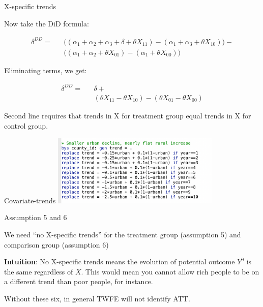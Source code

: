 \documentclass{beamer}
\begin{document}
\begin{frame}{X-specific trends}

Now take the DiD formula:

\begin{eqnarray*}
\delta^{DD} = &&\bigg ( (\alpha_1 + \alpha_2 + \alpha_3 + \delta + \theta X_{11} ) - (\alpha_1 + \alpha_3 + \theta X_{10} ) \bigg )- \\
&& \bigg ( (\alpha_1 + \alpha_2 + \theta X_{01}) - (\alpha_1 + \theta X_{00}) \bigg )
\end{eqnarray*}

\bigskip

Eliminating terms, we get:

\begin{eqnarray*}
\delta^{DD} = &&\delta + \\
&& (\theta X_{11} - \theta X_{10} ) - (\theta X_{01} - \theta X_{00} )
\end{eqnarray*}

\bigskip

Second line requires that trends in X for treatment group equal trends in X for control group.

\end{frame}


\begin{frame}{Covariate-trends}
    \centering
    \includegraphics[width=0.6\textwidth]{./lecture_includes/covariate_trends}
\end{frame}


\begin{frame}{Assumption 5 and 6}

We need ``no X-specific trends'' for the treatment group (assumption 5) and comparison group (assumption 6)

\bigskip

\textbf{Intuition}: No X-specific trends means the evolution of potential outcome $Y^0$ is the same regardless of $X$. This would mean you cannot allow rich people to be on a different trend than poor people, for instance.

\bigskip

Without these six, in general TWFE will not identify ATT. 

\end{frame}
\end{document}
